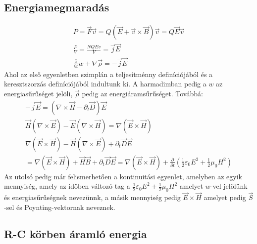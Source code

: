 \documentclass{article}
\begin{document}
\subsection{Energiamegmaradás}
\begin{gather*}
P= \vec{F} \vec{v} = Q(\vec{E} + \vec{v} \times \vec{B})\vec{v} = Q\vec{E}\vec{v} \\
\frac{P}{V} = \frac{NQEv}{V} = \vec{j} \vec{E} \\
\frac{\partial }{\partial t} w + \nabla \vec{\rho} = -\vec{j} \vec{E}
\end{gather*}
Ahol az első egyenletben szimplán a teljesítménny definíciójából és a keresztszorzás definíciójából indultunk ki. A harmadimban pedig a $w$ az energiasűrűséget jelöli, $\vec{\rho}$ pedig az energiáramsűrűséget. Továbbá:
\begin{gather*}
-\vec{j}\vec{E} = (\nabla \times \vec{H} - \partial_t \vec{D}) \vec{E} \\
\vec{H} (\nabla \times \vec{E}) - \vec{E} (\nabla \times \vec{H}) = \nabla (\vec{E} \times \vec{H}) \\
\nabla (\vec{E} \times \vec{H}) - \vec{H} (\nabla \times \vec{E}) + \partial_t \vec{D} \vec{E}\\
=\nabla (\vec{E} \times \vec{H}) + \vec{H} \vec{B} + \partial_t \vec{D} \vec{E} = \nabla (\vec{E} \times \vec{H}) + \frac{\partial }{\partial t} \left( \frac{1}{2}\varepsilon_0 E^2 + \frac{1}{2} \mu_0 H^2 \right)
\end{gather*}
Az utolsó pedig már felismerhetően a kontinuitási egyenlet, amelyben az egyik mennyiség, amely az időben változó tag a $\frac{1}{2}\varepsilon_0 E^2 + \frac{1}{2} \mu_0 H^2$ amelyet $w$-vel jelölünk és energiasűrűségnek nevezünnk, a másik mennyiség pedig $\vec{E} \times \vec{H}$ amelyet pedig $\vec{S}$-sel és Poynting-vektornak neveznek.
\subsection{R-C körben áramló energia}
\end{document}
